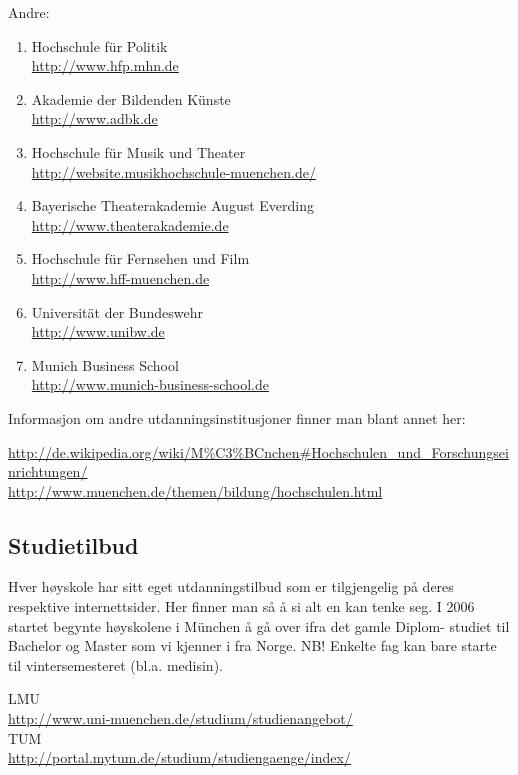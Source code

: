 Andre:
\begin{enumerate}
\item Hochschule für Politik \\
\url{http://www.hfp.mhn.de}
\item Akademie der Bildenden Künste \\
\url{http://www.adbk.de}
\item Hochschule für Musik und Theater \\
\url{http://website.musikhochschule-muenchen.de/}
\item Bayerische Theaterakademie August Everding \\
\url{http://www.theaterakademie.de}
\item Hochschule für Fernsehen und Film \\
\url{http://www.hff-muenchen.de}
\item Universität der Bundeswehr \\
\url{http://www.unibw.de}
\item Munich Business School \\
\url{http://www.munich-business-school.de}
\end{enumerate}




Informasjon om andre utdanningsinstitusjoner finner man blant annet her:

\url{http://de.wikipedia.org/wiki/M\%C3\%BCnchen#Hochschulen_und_Forschungseinrichtungen/}\\

\url{http://www.muenchen.de/themen/bildung/hochschulen.html}



\subsection{Studietilbud}
Hver høyskole har sitt eget utdanningstilbud som er tilgjengelig på deres respektive internettsider. Her finner man så å si alt en kan tenke seg. 
I 2006 startet begynte høyskolene i München å gå over ifra det gamle Diplom- studiet til Bachelor og Master som vi kjenner i fra Norge.
NB! Enkelte fag kan bare starte til vintersemesteret (bl.a. medisin).



LMU\\
 \url{http://www.uni-muenchen.de/studium/studienangebot/}\\

TUM\\
 \url{http://portal.mytum.de/studium/studiengaenge/index/}\\

